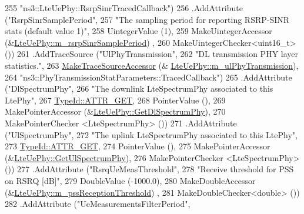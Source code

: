 \begin{DoxyCode}
255                      \textcolor{stringliteral}{"ns3::LteUePhy::RsrpSinrTracedCallback"})
256     .AddAttribute (\textcolor{stringliteral}{"RsrpSinrSamplePeriod"},
257                    \textcolor{stringliteral}{"The sampling period for reporting RSRP-SINR stats (default value 1)"},
258                    UintegerValue (1),
259                    MakeUintegerAccessor (&\hyperlink{classns3_1_1LteUePhy_a850c3c3e0a9f23f2907a2a6647a23f84}{LteUePhy::m\_rsrpSinrSamplePeriod})
      ,
260                    MakeUintegerChecker<uint16\_t> ())
261     .AddTraceSource (\textcolor{stringliteral}{"UlPhyTransmission"},
262                      \textcolor{stringliteral}{"DL transmission PHY layer statistics."},
263                      \hyperlink{group__tracing_gab21a770b9855af4e8f69f7531ea4a6b0}{MakeTraceSourceAccessor} (&
      \hyperlink{classns3_1_1LteUePhy_ac202a6c628e4657e46db7746728b1162}{LteUePhy::m\_ulPhyTransmission}),
264                      \textcolor{stringliteral}{"ns3::PhyTransmissionStatParameters::TracedCallback"})
265     .AddAttribute (\textcolor{stringliteral}{"DlSpectrumPhy"},
266                    \textcolor{stringliteral}{"The downlink LteSpectrumPhy associated to this LtePhy"},
267                    \hyperlink{classns3_1_1TypeId_a3ab7b43b95f96391c514d609ca60e542a3dd4b476c9b257285c177d6c414b5fd0}{TypeId::ATTR\_GET},
268                    PointerValue (),
269                    MakePointerAccessor (&\hyperlink{classns3_1_1LteUePhy_a37b112f6bd9ebc385288eaf047169ee5}{LteUePhy::GetDlSpectrumPhy}),
270                    MakePointerChecker <LteSpectrumPhy> ())
271     .AddAttribute (\textcolor{stringliteral}{"UlSpectrumPhy"},
272                    \textcolor{stringliteral}{"The uplink LteSpectrumPhy associated to this LtePhy"},
273                    \hyperlink{classns3_1_1TypeId_a3ab7b43b95f96391c514d609ca60e542a3dd4b476c9b257285c177d6c414b5fd0}{TypeId::ATTR\_GET},
274                    PointerValue (),
275                    MakePointerAccessor (&\hyperlink{classns3_1_1LteUePhy_adc5d954006e18da9dc98e633c8857b34}{LteUePhy::GetUlSpectrumPhy}),
276                    MakePointerChecker <LteSpectrumPhy> ())
277     .AddAttribute (\textcolor{stringliteral}{"RsrqUeMeasThreshold"},
278                    \textcolor{stringliteral}{"Receive threshold for PSS on RSRQ [dB]"},
279                    DoubleValue (-1000.0),
280                    MakeDoubleAccessor (&\hyperlink{classns3_1_1LteUePhy_af32a732f17a4d74ccd03b03471b5e1d3}{LteUePhy::m\_pssReceptionThreshold})
      ,
281                    MakeDoubleChecker<double> ())
282     .AddAttribute (\textcolor{stringliteral}{"UeMeasurementsFilterPeriod"},

\end{DoxyCode}
